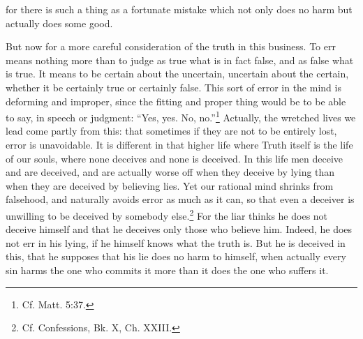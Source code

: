 for there is such a thing as a fortunate mistake which not only does no harm but actually does some good.

But now for a more careful consideration of the truth in this business. To err means nothing more than to judge as true what is in fact false, and as false what is true. It means to be certain about the uncertain, uncertain about the certain, whether it be certainly true or certainly false. This sort of error in the mind is deforming and improper, since the fitting and proper thing would be to be able to say, in speech or judgment: ``Yes, yes. No, no.''\footnote{Cf. Matt. 5:37.} Actually, the wretched lives we lead come partly from this: that sometimes if they are not to be entirely lost, error is unavoidable. It is different in that higher life where Truth itself is the life of our souls, where none deceives and none is deceived. In this life men deceive and are deceived, and are actually worse off when they deceive by lying than when they are deceived by believing lies. Yet our rational mind shrinks from falsehood, and naturally avoids error as much as it can, so that even a deceiver is unwilling to be deceived by somebody else.\footnote{Cf. Confessions, Bk. X, Ch. XXIII.} For the liar thinks he does not deceive himself and that he deceives only those who believe him. Indeed, he does not err in his lying, if he himself knows what the truth is. But he is deceived in this, that he supposes that his lie does no harm to himself, when actually every sin harms the one who commits it more than it does the one who suffers it.


